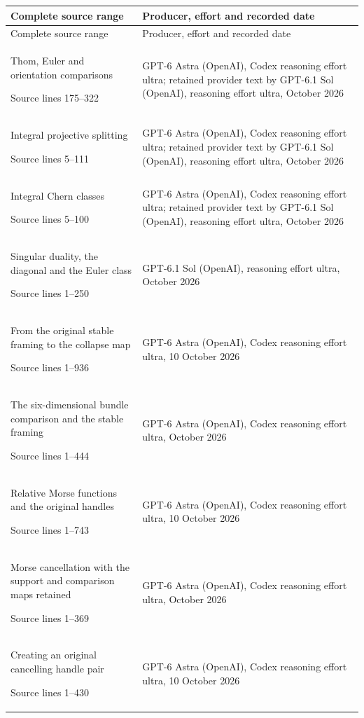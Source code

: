 \begingroup\small
\begin{longtable}{@{}p{61mm}p{87mm}@{}}
\toprule Complete source range & Producer, effort and recorded date\\\midrule
\endfirsthead
\toprule Complete source range & Producer, effort and recorded date\\\midrule
\endhead
Thom,\allowbreak{} Euler and orientation comparisons\par Source lines 175–322 & GPT-6 Astra (OpenAI),\allowbreak{} Codex reasoning effort ultra; retained provider text by GPT-6.1 Sol (OpenAI),\allowbreak{} reasoning effort ultra,\allowbreak{} October 2026\\
Integral projective splitting\par Source lines 5–111 & GPT-6 Astra (OpenAI),\allowbreak{} Codex reasoning effort ultra; retained provider text by GPT-6.1 Sol (OpenAI),\allowbreak{} reasoning effort ultra,\allowbreak{} October 2026\\
Integral Chern classes\par Source lines 5–100 & GPT-6 Astra (OpenAI),\allowbreak{} Codex reasoning effort ultra; retained provider text by GPT-6.1 Sol (OpenAI),\allowbreak{} reasoning effort ultra,\allowbreak{} October 2026\\
Singular duality,\allowbreak{} the diagonal and the Euler class\par Source lines 1–250 & GPT-6.1 Sol (OpenAI),\allowbreak{} reasoning effort ultra,\allowbreak{} October 2026\\
From the original stable framing to the collapse map\par Source lines 1–936 & GPT-6 Astra (OpenAI),\allowbreak{} Codex reasoning effort ultra,\allowbreak{} 10 October 2026\\
The six-dimensional bundle comparison and the stable framing\par Source lines 1–444 & GPT-6 Astra (OpenAI),\allowbreak{} Codex reasoning effort ultra,\allowbreak{} October 2026\\
Relative Morse functions and the original handles\par Source lines 1–743 & GPT-6 Astra (OpenAI),\allowbreak{} Codex reasoning effort ultra,\allowbreak{} 10 October 2026\\
Morse cancellation with the support and comparison maps retained\par Source lines 1–369 & GPT-6 Astra (OpenAI),\allowbreak{} Codex reasoning effort ultra,\allowbreak{} October 2026\\
Creating an original cancelling handle pair\par Source lines 1–430 & GPT-6 Astra (OpenAI),\allowbreak{} Codex reasoning effort ultra,\allowbreak{} 10 October 2026\\

\end{longtable}
